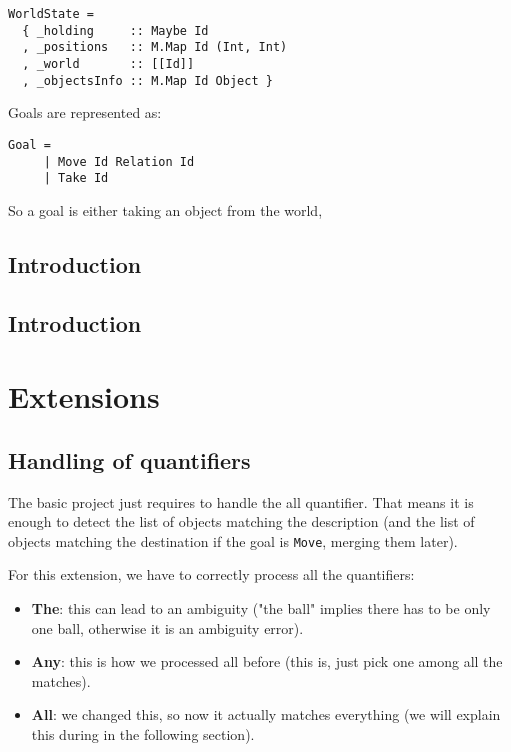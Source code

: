 \documentclass[11pt]{article}
\begin{document}
\begin{verbatim} 
WorldState = 
  { _holding     :: Maybe Id
  , _positions   :: M.Map Id (Int, Int)
  , _world       :: [[Id]]
  , _objectsInfo :: M.Map Id Object } 
\end{verbatim}
        Goals are represented as: 
\begin{verbatim}
Goal = 
     | Move Id Relation Id
     | Take Id 
\end{verbatim}
        So a goal is either taking an object from the world,  


	\subsection{Introduction}
	\subsection{Introduction}
        
        

	\section{Extensions}

	\subsection{Handling of quantifiers}

          The basic project just requires to handle the all quantifier.
          That means it is enough to detect the list of objects matching the description
          (and the list of objects matching the destination if the goal is \texttt{Move},
          merging them later).

          For this extension, we have to correctly process all the quantifiers:

          \begin{itemize}
            \item {\bf The}: this can lead to an ambiguity ("the ball" implies there has
            to be only one ball, otherwise it is an ambiguity error).
            \item {\bf Any}: this is how we processed all before (this is, just pick one
            among all the matches).
            \item {\bf All}: we changed this, so now it actually matches everything 
            (we will explain this during in the following section).
          \end{itemize}
\end{document}
